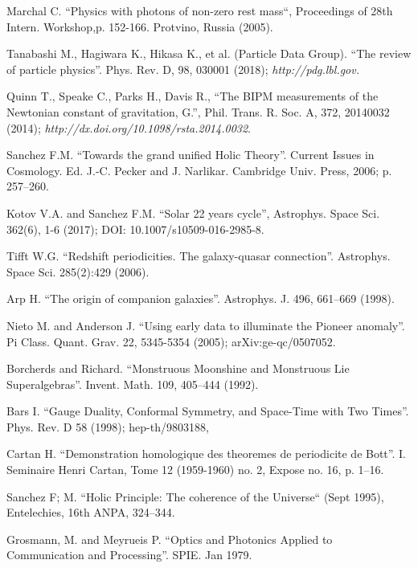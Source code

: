 \documentclass[twoside,draft]{article}
\begin{document}
\begin{sloppypar}
\begin{thebibliography}{99}
 Marchal C. ``Physics with photons of non-zero rest mass``, Proceedings of 28th Intern. Workshop,p. 152-166. Protvino, Russia (2005).


 Tanabashi M., Hagiwara K., Hikasa K., et al. (Particle Data
Group). ``The review of particle physics''. Phys. Rev. D, 98, 030001 (2018);
{\it http://pdg.lbl.gov.}

 Quinn T., Speake C., Parks H., Davis R., ``The BIPM measurements
of the Newtonian constant of gravitation, G.'', Phil. Trans. R. Soc. A, 372,
20140032 (2014); {\it http://dx.doi.org/10.1098/rsta.2014.0032}.

 Sanchez F.M. ``Towards the grand unified Holic Theory''. Current
Issues in Cosmology. Ed. J.-C. Pecker and J. Narlikar. Cambridge Univ. Press,
2006; p. 257--260.

 Kotov V.A. and Sanchez F.M. ``Solar 22 years cycle'', Astrophys.
Space Sci. 362(6), 1-6 (2017); DOI: 10.1007/s10509-016-2985-8.

 Tifft W.G. ``Redshift periodicities. The galaxy-quasar
connection''. Astrophys. Space Sci. 285(2):429 (2006).

 Arp H. ``The origin of companion galaxies''. Astrophys. J. 496,
661--669 (1998).

 Nieto M. and Anderson J. ``Using early data to illuminate the
Pioneer anomaly''. Pi Class. Quant. Grav. 22, 5345-5354 (2005);
arXiv:ge-qc/0507052.

 Borcherds and Richard. ``Monstruous Moonshine and Monstruous Lie
Superalgebras''. Invent. Math. 109, 405--444 (1992).

 Bars I. ``Gauge Duality, Conformal Symmetry, and Space-Time with
Two Times''. Phys. Rev. D 58 (1998); hep-th/9803188, 

 Cartan H. ``Demonstration homologique des theoremes de periodicite
de Bott''. I. Seminaire Henri Cartan, Tome 12 (1959-1960) no. 2, Expose no. 16,
p. 1--16.

 Sanchez F; M. ``Holic Principle: The coherence of the Universe`` (Sept 1995), Entelechies, 16th ANPA, 324--344.

 Grosmann, M. and Meyrueis P. ``Optics and Photonics Applied to Communication and Processing''. SPIE.  Jan 1979.


\end{thebibliography}
\end{sloppypar}
\end{document}
